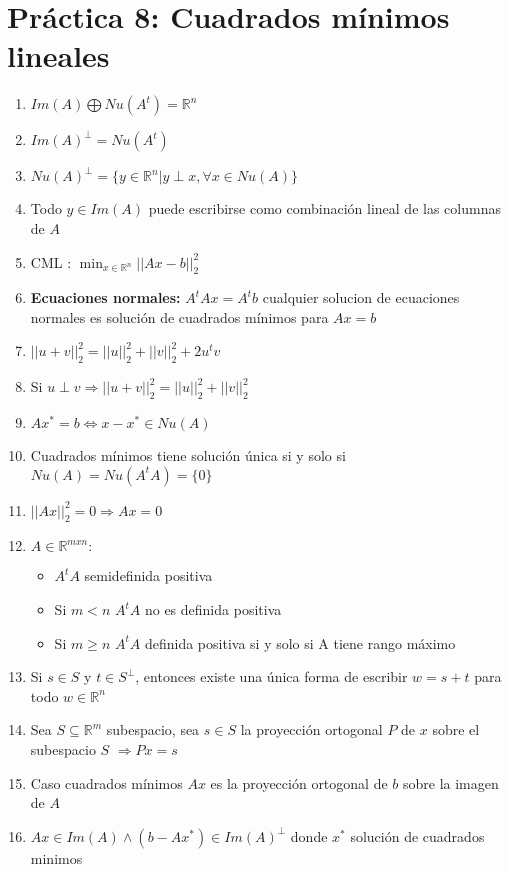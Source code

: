 \documentclass[10pt]{article}
\begin{document}
\section*{Práctica 8: Cuadrados mínimos lineales}
\begin{enumerate}
    \item $Im(A) \bigoplus Nu(A^t) = \mathbb{R}^n$
    \item $Im(A)^{\perp} = Nu(A^t)$
    \item $Nu(A)^{\perp} = \{y \in \mathbb{R}^n | y\perp x,  \forall x \in Nu(A)\}$
    \item Todo $y\in Im(A)$ puede escribirse como combinación lineal de las columnas de $A$
    \item CML : $\min_{x\in\mathbb{R}^n} ||Ax-b||_2^2$ 
    \item \textbf{Ecuaciones normales:} $A^tAx=A^tb$ cualquier solucion de ecuaciones normales es solución de cuadrados mínimos para $Ax=b$
    \item $||u+v||_2^2 = ||u||_2^2+||v||_2^2 + 2u^tv$
    \item Si $u\perp v \Rightarrow ||u+v||_2^2 = ||u||_2^2+||v||_2^2$ 
    \item $Ax^*=b \iff x-x^*\in Nu(A)$
    \item Cuadrados mínimos tiene solución única si y solo si $Nu(A) = Nu(A^tA)=\{0\}$
    \item $||Ax||_2^2= 0 \Rightarrow Ax=0$
     \item $A\in\mathbb{R}^{mxn}:$\begin{itemize}
         \item $A^tA$ semidefinida positiva
         \item Si $m<n$ $A^tA$ no es definida positiva
         \item Si $m\geq n$ $A^tA$ definida positiva si y solo si A tiene rango máximo
     \end{itemize}
     \item Si $s\in S$ y $t \in S^{\perp}$, entonces existe una única forma de escribir $w=s+t$ para todo $w\in\mathbb{R}^n$
     \item Sea $S\subseteq \mathbb{R}^m$ subespacio, sea $s \in S$ la proyección ortogonal $P$ de $x$ sobre el subespacio $S$ $\Rightarrow Px=s$
     \item Caso cuadrados mínimos $Ax$ es la proyección ortogonal de $b$ sobre la imagen de $A$
     \item $Ax \in Im(A) \land (b-Ax^*) \in Im(A)^{\perp}$ donde $x^*$ solución de cuadrados minimos
\end{enumerate}
\end{document}
